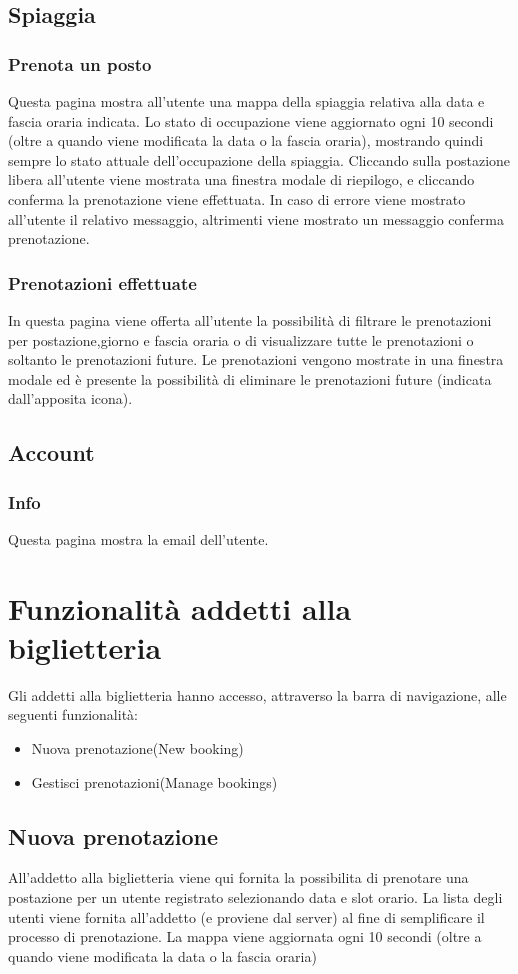 \documentclass{article}
\begin{document}
\subsection{Spiaggia}
\subsubsection{Prenota un posto}
Questa pagina mostra all'utente una mappa della spiaggia relativa alla data e fascia oraria indicata. Lo stato di occupazione viene aggiornato ogni 10 secondi (oltre a quando viene modificata la data o la fascia oraria), mostrando quindi sempre lo stato attuale dell'occupazione della spiaggia. Cliccando sulla postazione libera all'utente viene mostrata una finestra modale di riepilogo, e cliccando conferma la prenotazione viene effettuata. In caso di errore viene mostrato all'utente il relativo messaggio, altrimenti viene mostrato un messaggio conferma prenotazione.
\subsubsection{Prenotazioni effettuate} 
In questa pagina viene offerta all'utente la possibilità di filtrare le prenotazioni per postazione,giorno e fascia oraria o di visualizzare tutte le prenotazioni o soltanto le prenotazioni future.
Le prenotazioni vengono mostrate in una finestra modale ed è presente la possibilità di eliminare le prenotazioni future (indicata dall'apposita icona).
\subsection{Account}
\subsubsection{Info}
Questa pagina mostra la email dell'utente. 
\newpage
\section{Funzionalità addetti alla biglietteria}
Gli addetti alla biglietteria hanno accesso, attraverso la barra di navigazione, alle seguenti funzionalità:
\begin{itemize}
	\item Nuova prenotazione(New booking)
	\item Gestisci prenotazioni(Manage bookings)
\end{itemize}
\subsection{Nuova prenotazione}
All'addetto alla biglietteria viene qui fornita la possibilita di prenotare una postazione per un utente registrato selezionando data e slot orario. La lista degli utenti viene fornita all'addetto (e proviene dal server) al fine di semplificare il processo di prenotazione. La mappa viene aggiornata ogni 10 secondi (oltre a quando viene modificata la data o la fascia oraria)
\end{document}
